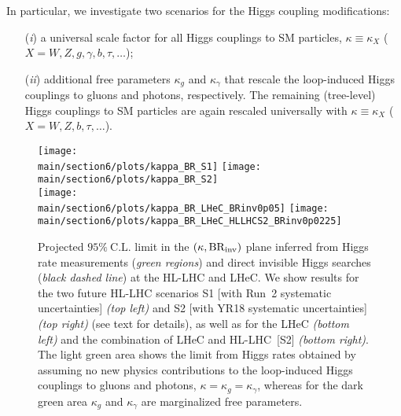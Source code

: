 \documentclass[../report.tex]{subfiles}
\providecommand{\main}{..}
\begin{document}
In particular, we investigate two scenarios for the Higgs coupling modifications:
\begin{enumerate}
\item[(\emph{i})] a universal scale factor for all Higgs couplings to SM particles, $\kappa \equiv \kappa_X$ ($X = W, Z, g, \gamma, b, \tau, \dots$);
\item[(\emph{ii})] additional free parameters $\kappa_g$ and $\kappa_\gamma$ that rescale the loop-induced Higgs couplings to gluons and photons, respectively. The remaining (tree-level) Higgs couplings to SM particles are again rescaled universally with $\kappa \equiv  \kappa_X$ ($X = W, Z, b, \tau, \dots$).
\end{enumerate}

\begin{figure}
\centering
\texttt{[image: \\main/section6/plots/kappa\_BR\_S1]}
\hfill
\texttt{[image: \\main/section6/plots/kappa\_BR\_S2]}\\
\texttt{[image: \\main/section6/plots/kappa\_BR\_LHeC\_BRinv0p05]}
\hfill
\texttt{[image: \\main/section6/plots/kappa\_BR\_LHeC\_HLLHCS2\_BRinv0p0225]}
\caption{Projected $95\%~\mathrm{C.L.}$ limit in the $(\kappa, \mathrm{BR}_\mathrm{inv})$ plane inferred from Higgs rate measurements (\emph{green regions}) and direct invisible Higgs searches (\emph{black dashed line}) at the HL-LHC and LHeC. We show results for the two future HL-LHC scenarios S1 [with Run~2 systematic uncertainties] {\sl (top left)} and S2 [with YR18 systematic uncertainties] {\sl (top right)} (see text for details), as well as for the LHeC {\sl (bottom left)} and the combination of LHeC and HL-LHC~[S2] {\sl (bottom right)}. The light green area shows the limit from Higgs rates obtained by assuming no new physics contributions to the loop-induced Higgs couplings to gluons and photons, $\kappa = \kappa_g = \kappa_\gamma$, whereas for the dark green area $\kappa_g$ and $\kappa_\gamma$ are marginalized free parameters.}
\label{fig:effC}
\end{figure}
\end{document}

